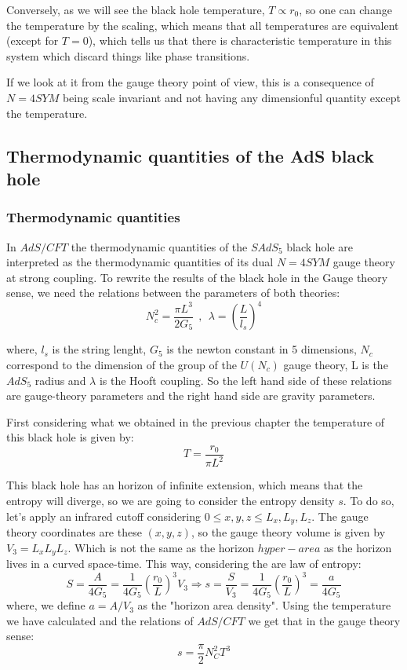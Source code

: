 \documentclass[12pt]{article}
\begin{document}
\vspace{.25cm}

Conversely, as we will see the black hole temperature, $T\propto r_0$, so one can change the temperature by the scaling, which means that all temperatures are equivalent (except for $T=0$), which tells us that there is characteristic temperature in this system which discard things like phase transitions.

\vspace{.25cm}
If we look at it from the gauge theory point of view, this is a consequence of $N=4 SYM$ being scale invariant and not having any dimensionful quantity except the temperature.

\subsection{Thermodynamic quantities of the AdS black hole}

\subsubsection{Thermodynamic quantities}

In $AdS/CFT$ the thermodynamic quantities of the $SAdS_5$ black hole are interpreted as the thermodynamic quantities of its dual $N=4 SYM$ gauge theory at strong coupling. To rewrite the results of the black hole in the Gauge theory sense, we need the relations between the parameters of both theories:
\[
    N_c^2 = \frac{\pi L^3}{2G_5} ~~,~~ \lambda = \left(\frac{L}{l_s}\right)^4
\]

where, $l_s$ is the string lenght, $G_5$ is the newton constant in 5 dimensions, $N_c$ correspond to the dimension of the group of the $U(N_c)$ gauge theory, L is the $AdS_5$ radius and $\lambda$ is the Hooft coupling. So the left hand side of these relations are gauge-theory parameters and the right hand side are gravity parameters. 

\vspace{.25cm}

First considering what we obtained in the previous chapter the temperature of this black hole is given by:
\[
    T=\frac{r_0}{\pi L^2}
\]

This black hole has an horizon of infinite extension, which means that the entropy will diverge, so we are going to consider the entropy density $s$. To do so, let's apply an infrared cutoff considering $0\leq x,y,z\leq L_x,L_y,L_z$. The gauge theory coordinates are these $(x,y,z)$, so the gauge theory volume is given by $V_3 = L_x L_y L_z$. Which is not the same as the horizon $hyper-area$ as the horizon lives in a curved space-time. This way, considering the are law of entropy:
\[
    S=\frac{A}{4G_5} = \frac{1}{4G_5}\left(\frac{r_0}{L}\right)^3 V_3 \Rightarrow s = \frac{S}{V_3} = \frac{1}{4G_5}\left(\frac{r_0}{L}\right)^3 = \frac{a}{4G_5}
\]
where, we define $a=A/V_3$ as the "horizon area density". Using the temperature we have calculated and the relations of $AdS/CFT$ we get that in the gauge theory sense:
\[
    s=\frac{\pi}{2}N_C^2 T^3
\]
\end{document}
